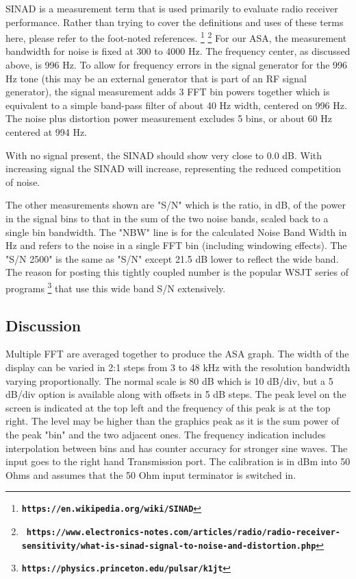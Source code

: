 SINAD is a measurement term that is used primarily to evaluate radio receiver performance.  Rather than trying to cover the definitions and uses of these terms here, please refer to the foot-noted references. \footnote{\textbf{\texttt{https://en.wikipedia.org/wiki/SINAD}}} \footnote{{\tiny\ \textbf{\texttt{https://www.electronics-notes.com/articles/radio/radio-receiver-sensitivity/what-is-sinad-signal-to-noise-and-distortion.php}}}}
%
For our ASA, the measurement bandwidth for noise is fixed at 300 to 4000 Hz.  The frequency center, as discussed above, is 996 Hz.  To allow for frequency errors in the signal generator for the 996 Hz tone (this may be an external generator that is part of an RF signal generator), the signal measurement adds 3 FFT bin powers together which is equivalent to a simple band-pass filter of about 40 Hz width, centered on 996 Hz.  The noise plus distortion power measurement excludes 5 bins, or about 60 Hz centered at 994 Hz.

With no signal present, the SINAD should show very close to 0.0 dB.  With increasing signal the SINAD will increase, representing the reduced competition of noise. 

The other measurements shown are "\textsf{S/N}" which is the ratio, in dB, of the power in the signal bins to that in the sum of the two noise bands, scaled back to a single bin bandwidth.   The "\textsf{NBW}"  line is for the calculated Noise Band Width in Hz and refers to the noise in a single FFT bin (including windowing effects).   The "\textsf{S/N 2500}" is the same as "\textsf{S/N}" except 21.5 dB lower to reflect the wide band.  The reason for posting this tightly coupled number is the popular WSJT series of programs
%
\footnote{\textbf{\texttt{https://physics.princeton.edu/pulsar/k1jt}}}
%
that use this wide band S/N extensively.

\subsection{Discussion}
\label{subsect:ASADiscus}
Multiple FFT are averaged together to produce the ASA graph.  The width of the display can be varied in 2:1 steps from 3 to 48 kHz with the resolution bandwidth varying proportionally.  The normal scale is 80 dB which is 10 dB/div, but a 5 dB/div option is available along with offsets in 5 dB steps.  The peak level on the screen is indicated at the top left and the frequency of this peak is at the top right.  The level may be higher than the graphics peak as it is the sum power of the peak "bin" and the two adjacent ones.  The frequency indication includes interpolation between bins and has counter accuracy for stronger sine waves.  The input goes to the right hand Transmission port.  The calibration is in dBm into 50 Ohms and assumes that the 50 Ohm input terminator is switched in.
